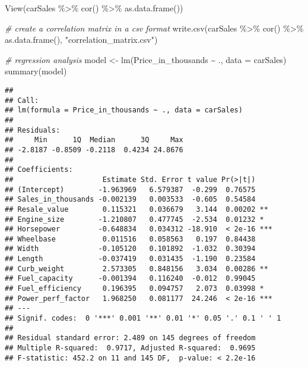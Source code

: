 \documentclass[
]{article}
\newenvironment{Shaded}{\begin{snugshade}}{\end{snugshade}}
\newcommand{\AttributeTok}[1]{\textcolor[rgb]{0.77,0.63,0.00}{#1}}
\newcommand{\CommentTok}[1]{\textcolor[rgb]{0.56,0.35,0.01}{\textit{#1}}}
\newcommand{\FunctionTok}[1]{\textcolor[rgb]{0.00,0.00,0.00}{#1}}
\newcommand{\NormalTok}[1]{#1}
\newcommand{\OtherTok}[1]{\textcolor[rgb]{0.56,0.35,0.01}{#1}}
\newcommand{\SpecialCharTok}[1]{\textcolor[rgb]{0.00,0.00,0.00}{#1}}
\newcommand{\StringTok}[1]{\textcolor[rgb]{0.31,0.60,0.02}{#1}}
\begin{document}
\begin{Shaded}
\begin{Highlighting}[]
\FunctionTok{View}\NormalTok{(carSales }\SpecialCharTok{\%\textgreater{}\%}
  \FunctionTok{cor}\NormalTok{() }\SpecialCharTok{\%\textgreater{}\%}
  \FunctionTok{as.data.frame}\NormalTok{())}

\CommentTok{\# create a correlation matrix in a csv format}
\FunctionTok{write.csv}\NormalTok{(carSales }\SpecialCharTok{\%\textgreater{}\%}
  \FunctionTok{cor}\NormalTok{() }\SpecialCharTok{\%\textgreater{}\%}
  \FunctionTok{as.data.frame}\NormalTok{(),}
  \StringTok{"correlation\_matrix.csv"}\NormalTok{)}

\CommentTok{\# regression analysis}
\NormalTok{model }\OtherTok{\textless{}{-}} \FunctionTok{lm}\NormalTok{(Price\_in\_thousands }\SpecialCharTok{\textasciitilde{}}\NormalTok{ .,}
            \AttributeTok{data =}\NormalTok{ carSales)}
\FunctionTok{summary}\NormalTok{(model)}
\end{Highlighting}
\end{Shaded}

\begin{verbatim}
## 
## Call:
## lm(formula = Price_in_thousands ~ ., data = carSales)
## 
## Residuals:
##     Min      1Q  Median      3Q     Max 
## -2.8187 -0.8509 -0.2118  0.4234 24.8676 
## 
## Coefficients:
##                     Estimate Std. Error t value Pr(>|t|)    
## (Intercept)        -1.963969   6.579387  -0.299  0.76575    
## Sales_in_thousands -0.002139   0.003533  -0.605  0.54584    
## Resale_value        0.115321   0.036679   3.144  0.00202 ** 
## Engine_size        -1.210807   0.477745  -2.534  0.01232 *  
## Horsepower         -0.648834   0.034312 -18.910  < 2e-16 ***
## Wheelbase           0.011516   0.058563   0.197  0.84438    
## Width              -0.105120   0.101892  -1.032  0.30394    
## Length             -0.037419   0.031435  -1.190  0.23584    
## Curb_weight         2.573305   0.848156   3.034  0.00286 ** 
## Fuel_capacity      -0.001394   0.116240  -0.012  0.99045    
## Fuel_efficiency     0.196395   0.094757   2.073  0.03998 *  
## Power_perf_factor   1.968250   0.081177  24.246  < 2e-16 ***
## ---
## Signif. codes:  0 '***' 0.001 '**' 0.01 '*' 0.05 '.' 0.1 ' ' 1
## 
## Residual standard error: 2.489 on 145 degrees of freedom
## Multiple R-squared:  0.9717, Adjusted R-squared:  0.9695 
## F-statistic: 452.2 on 11 and 145 DF,  p-value: < 2.2e-16
\end{verbatim}
\end{document}
